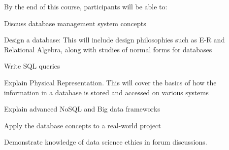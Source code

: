 By the end of this course, participants will be able to:

\begin{outline}
    \1  	Discuss database management system concepts
	
    \1  	Design a database: 
		This will include design philosophies such as E-R and Relational Algebra, along with studies of 
		normal forms for databases

    \1  	Write SQL queries

    \1  	Explain Physical Representation. 
		This will cover the basics of how the information in a database is stored and accessed on various systems

    \1  	Explain advanced NoSQL and Big data frameworks 

    \1  	Apply the database concepts to a real-world project

    \1  	Demonstrate knowledge of data science ethics in forum discussions.

\end{outline} 
